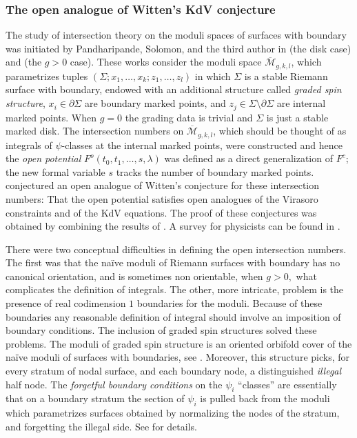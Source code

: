 \documentclass[11pt]{amsart}
\theoremstyle{definition}
\theoremstyle{remark}
\newcommand{\<}{\left<}
\renewcommand{\>}{\right>}
\numberwithin{equation}{section}
\def\Mbar{{\overline{\mathcal M}}}
\begin{document}
\subsubsection{The open analogue of Witten's KdV conjecture}
The study of intersection theory on the moduli spaces of surfaces with boundary was initiated by Pandharipande, Solomon, and the third author in \cite{PST14} (the disk case) and \cite{ST1,Tes15} (the $g>0$ case).  These works consider the moduli space $\Mbar_{g,k,l}$, which parametrizes tuples $(\Sigma; x_1, \ldots, x_k; z_1, \ldots, z_l)$ in which $\Sigma$ is a stable Riemann surface with boundary, endowed with an additional structure called \emph{graded spin structure}, $x_i \in \partial\Sigma$ are boundary marked points, and $z_j \in \Sigma \setminus \partial\Sigma$ are internal marked points. When $g=0$ the grading data is trivial and $\Sigma$ is just a stable marked disk. The intersection numbers on $\Mbar_{g,k,l}$, which should be thought of as integrals of $\psi$-classes at the internal marked points, were constructed and hence the \emph{open potential} $F^o(t_0,t_1,\ldots,s,\lambda)$ was defined as a direct generalization of $F^c$; the new formal variable $s$ tracks the number of boundary marked points. \cite{PST14} conjectured an open analogue of Witten's conjecture for these intersection numbers: That the open potential satisfies open analogues of the Virasoro constraints and of the KdV equations. The proof of these conjectures was obtained by combining the results of \cite{Bur16,Tes15,BT17}. A survey for physicists can be found in \cite{DijkWit}.

There were two conceptual difficulties in defining the open intersection numbers. The first was that the na\"ive moduli of Riemann surfaces with boundary has no canonical orientation, and is sometimes non orientable, when $g>0,$ what complicates the definition of integrals. The other, more intricate, problem is the presence of real codimension $1$ boundaries for the moduli. Because of these boundaries any reasonable definition of integral should involve an imposition of boundary conditions. The inclusion of graded spin structures solved these problems. The moduli of graded spin structure is an oriented orbifold cover of the na\"ive moduli of surfaces with boundaries, see \cite[\S 5]{Tes15}. Moreover, this structure picks, for every stratum of nodal surface, and each boundary node, a distinguished \emph{illegal} half node. The \emph{forgetful boundary conditions} on the $\psi_i$ ``classes'' are essentially that on a boundary stratum the section of $\psi_i$ is pulled back from the moduli which parametrizes surfaces obtained by normalizing the nodes of the stratum, and forgetting the illegal side. See \cite[\S 2]{Tes15} for details. 
\end{document}
